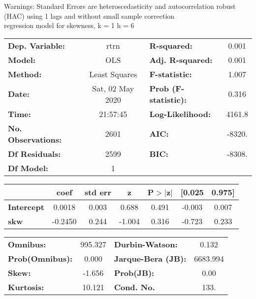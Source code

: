 Warnings: \newline
 [1] Standard Errors are heteroscedasticity and autocorrelation robust (HAC) using 1 lags and without small sample correction\\ 

regression model for skewness, k = 1 h = 6\begin{center}
\begin{tabular}{lclc}
\toprule
\textbf{Dep. Variable:}    &       rtrn       & \textbf{  R-squared:         } &     0.001   \\
\textbf{Model:}            &       OLS        & \textbf{  Adj. R-squared:    } &     0.001   \\
\textbf{Method:}           &  Least Squares   & \textbf{  F-statistic:       } &     1.007   \\
\textbf{Date:}             & Sat, 02 May 2020 & \textbf{  Prob (F-statistic):} &    0.316    \\
\textbf{Time:}             &     21:57:45     & \textbf{  Log-Likelihood:    } &    4161.8   \\
\textbf{No. Observations:} &        2601      & \textbf{  AIC:               } &    -8320.   \\
\textbf{Df Residuals:}     &        2599      & \textbf{  BIC:               } &    -8308.   \\
\textbf{Df Model:}         &           1      & \textbf{                     } &             \\
\bottomrule
\end{tabular}
\begin{tabular}{lcccccc}
                   & \textbf{coef} & \textbf{std err} & \textbf{z} & \textbf{P$> |$z$|$} & \textbf{[0.025} & \textbf{0.975]}  \\
\midrule
\textbf{Intercept} &       0.0018  &        0.003     &     0.688  &         0.491        &       -0.003    &        0.007     \\
\textbf{skw}       &      -0.2450  &        0.244     &    -1.004  &         0.316        &       -0.723    &        0.233     \\
\bottomrule
\end{tabular}
\begin{tabular}{lclc}
\textbf{Omnibus:}       & 995.327 & \textbf{  Durbin-Watson:     } &    0.132  \\
\textbf{Prob(Omnibus):} &   0.000 & \textbf{  Jarque-Bera (JB):  } & 6683.994  \\
\textbf{Skew:}          &  -1.656 & \textbf{  Prob(JB):          } &     0.00  \\
\textbf{Kurtosis:}      &  10.121 & \textbf{  Cond. No.          } &     133.  \\
\bottomrule
\end{tabular}
\end{center}

